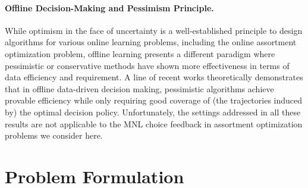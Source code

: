 \documentclass[10pt, letterpaper]{article}
\begin{document}
\paragraph{Offline Decision-Making and Pessimism Principle.} 
While optimism in the face of uncertainty is a well-established principle to design algorithms for various online learning problems, including the online assortment optimization problem, offline learning presents a different paradigm where pessimistic or conservative methods \citep{yu2020mopo,kumar2020conservative} have shown more effectiveness in terms of data efficiency and requirement. 
A line of recent works \citep{jin2021pessimism,rashidinejad2021bridging,xie2021bellman,uehara2021pessimistic,zhong2022pessimistic,zhan2022offline,liu2022welfare,shi2022pessimistic,lu2023pessimism,xiong2023nearly,rashidinejad2023optimal, blanchet2024double} theoretically demonstrates that in offline data-driven decision making, pessimistic algorithms achieve provable efficiency while only requiring good coverage of (the trajectories induced by) the optimal decision policy. 
Unfortunately, the settings addressed in all these results are not applicable to the MNL choice feedback in assortment optimization problems we consider here. 

\section{Problem Formulation}\label{sec:Method}
\end{document}

